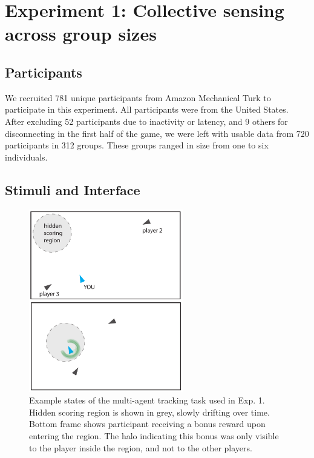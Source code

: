 \documentclass[12pt,letterpaper]{article}
\begin{document}




\section{Experiment 1: Collective sensing across group sizes}

\subsection{Participants}
We recruited 781 unique participants from Amazon Mechanical Turk to participate in this experiment.  All participants were from the United States.  After excluding 52 participants due to inactivity or latency, and 9 others for disconnecting in the first half of the game, we were left with usable data from 720 participants in 312 groups.  These groups ranged in size from one to six individuals. 

\subsection{Stimuli and Interface}

\begin{figure}[t!]
  \centering
  \includegraphics[width=0.6\textwidth]{./figures/experiment1_design.pdf}
  \hspace{0.1cm}
  \caption{Example states of the multi-agent tracking task used in Exp. 1. Hidden scoring region is shown in grey, slowly drifting over time. Bottom frame shows participant receiving a bonus reward upon entering the region. The halo indicating this bonus was only visible to the player inside the region, and not to the other players.}
  \label{fig:score}
\end{figure}
\end{document}
